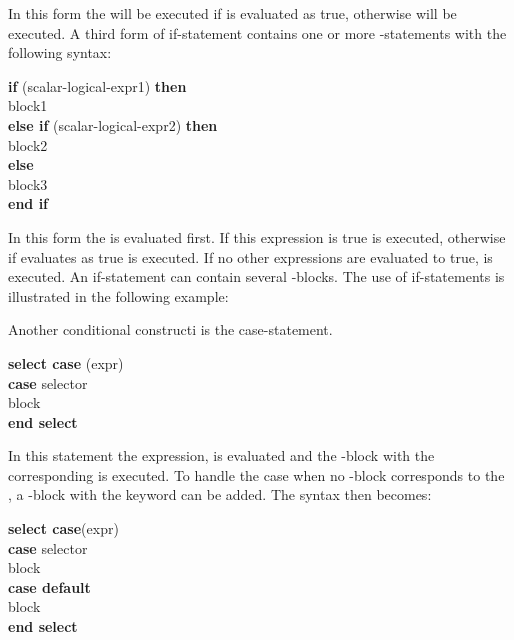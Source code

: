 In this form the  will be executed if  is evaluated as true, otherwise  will be executed. A third form of if-statement contains one or more -statements with the following syntax:

\begin{fsyntax}
\textbf{if} (scalar-logical-expr1) \textbf{then}\\
\ftab block1\\
\textbf{else if} (scalar-logical-expr2) \textbf{then}\\
\ftab block2\\
\textbf{else}\\
\ftab block3\\
\textbf{end if}
\end{fsyntax}

In this form the  is evaluated first. If this expression is true  is executed, otherwise if  evaluates as true  is executed. If no other expressions are evaluated to true,  is executed. An if-statement can contain several -blocks. The use of if-statements is illustrated in the following example:


Another conditional constructi is the case-statement.

\begin{fsyntax}
\textbf{select case} (expr)\\
\ftab\textbf{case} selector \\
\ftab\ftab block  \\
\textbf{end select}
\end{fsyntax}

In this statement the expression,  is evaluated and the -block with the corresponding  is executed. To handle the case when no -block corresponds to the , a -block with the  keyword can be added. The syntax then becomes:

\begin{fsyntax}
\textbf{select case}(expr)\\
\ftab\textbf{case} selector\\
\ftab\ftab block \\
\ftab\textbf{case default}\\
\ftab\ftab block \\
\textbf{end select}
\end{fsyntax}

